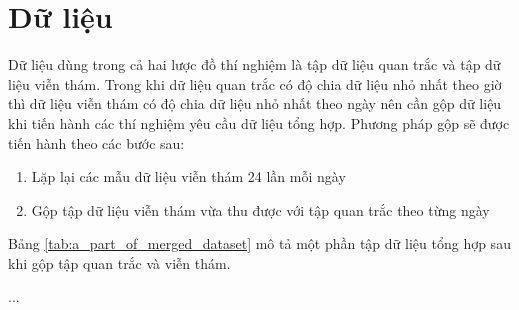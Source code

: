\section{Dữ liệu}
Dữ liệu dùng trong cả hai lược đồ thí nghiệm là tập dữ liệu quan trắc và tập dữ liệu viễn thám. Trong khi dữ liệu quan trắc có độ chia dữ liệu nhỏ nhất theo giờ thì dữ liệu viễn thám có độ chia dữ liệu nhỏ nhất theo ngày nên cần gộp dữ liệu khi tiến hành các thí nghiệm yêu cầu dữ liệu tổng hợp. Phương pháp gộp sẽ được tiến hành theo các bước sau:
\begin{enumerate}
    \item Lặp lại các mẫu dữ liệu viễn thám 24 lần mỗi ngày
    \item Gộp tập dữ liệu viễn thám vừa thu được với tập quan trắc theo từng ngày
\end{enumerate}
Bảng \ref{tab:a_part_of_merged_dataset} mô tả một phần tập dữ liệu tổng hợp sau khi gộp tập quan trắc và viễn thám.

...